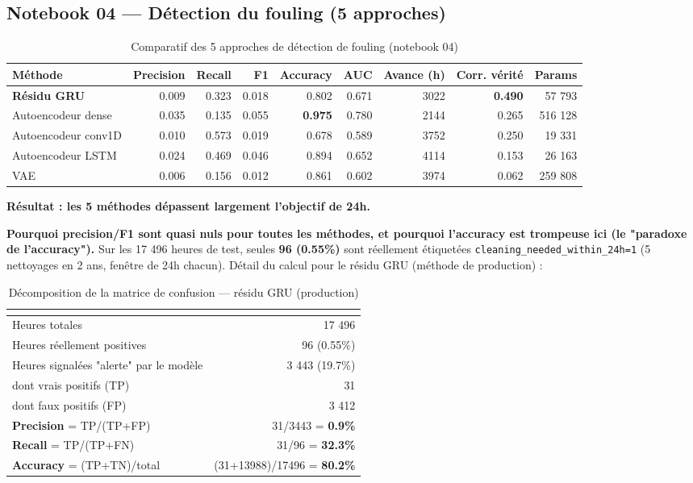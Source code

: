 \documentclass[11pt]{article}
\begin{document}
\subsection{Notebook 04 — Détection du fouling (5 approches)}
\label{sec:fouling}

\begin{table}[h]
\centering
\small
\begin{tabular}{lrrrrrrrr}
\toprule
Méthode & Precision & Recall & F1 & \textbf{Accuracy} & AUC & Avance (h) & Corr. vérité & Params \\
\midrule
\textbf{Résidu GRU} & 0.009 & 0.323 & 0.018 & 0.802 & 0.671 & 3022 & \textbf{0.490} & 57 793 \\
Autoencodeur dense & 0.035 & 0.135 & 0.055 & \textbf{0.975} & 0.780 & 2144 & 0.265 & 516 128 \\
Autoencodeur conv1D & 0.010 & 0.573 & 0.019 & 0.678 & 0.589 & 3752 & 0.250 & 19 331 \\
Autoencodeur LSTM & 0.024 & 0.469 & 0.046 & 0.894 & 0.652 & 4114 & 0.153 & 26 163 \\
VAE & 0.006 & 0.156 & 0.012 & 0.861 & 0.602 & 3974 & 0.062 & 259 808 \\
\bottomrule
\end{tabular}
\caption{Comparatif des 5 approches de détection de fouling (notebook 04)}
\end{table}

\textbf{Résultat : les 5 méthodes dépassent largement l'objectif de 24h. \checkmark}

\textbf{Pourquoi precision/F1 sont quasi nuls pour toutes les méthodes, et pourquoi l'accuracy
est trompeuse ici (le "paradoxe de l'accuracy").} Sur les 17 496 heures de test, seules
\textbf{96 (0.55\%)} sont réellement étiquetées \texttt{cleaning\_needed\_within\_24h=1} (5
nettoyages en 2 ans, fenêtre de 24h chacun). Détail du calcul pour le résidu GRU (méthode de
production) :

\begin{table}[h]
\centering
\begin{tabular}{lr}
\toprule
\multicolumn{2}{l}{} \\
\midrule
Heures totales & 17 496 \\
Heures réellement positives & 96 (0.55\%) \\
Heures signalées "alerte" par le modèle & 3 443 (19.7\%) \\
dont vrais positifs (TP) & 31 \\
dont faux positifs (FP) & 3 412 \\
\textbf{Precision} = TP/(TP+FP) & 31/3443 = \textbf{0.9\%} \\
\textbf{Recall} = TP/(TP+FN) & 31/96 = \textbf{32.3\%} \\
\textbf{Accuracy} = (TP+TN)/total & (31+13988)/17496 = \textbf{80.2\%} \\
\bottomrule
\end{tabular}
\caption{Décomposition de la matrice de confusion — résidu GRU (production)}
\end{table}
\end{document}
